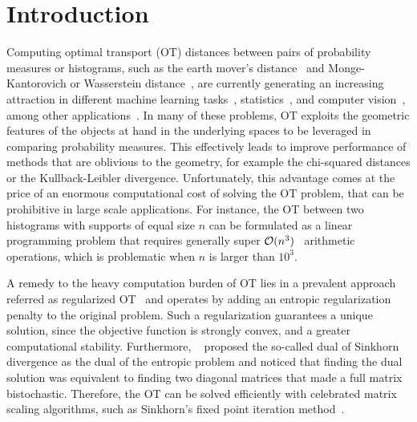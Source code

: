 
\section{Introduction} %
\label{sec:introduction}

Computing optimal transport (OT) distances between pairs of probability measures or histograms, such as the earth mover's distance~\citep{werman1985,Rubner2000} and Monge-Kantorovich or Wasserstein distance~\citep{villani09optimal}, are currently generating an increasing attraction in different machine learning tasks~\citep{pmlr-v32-solomon14,kusnerb2015,pmlr-v70-arjovsky17a,ho2017}, statistics~\citep{frogner2015nips,panaretos2016,ebert2017ConstructionON,bigot2017,flamary2018WDA}, and computer vision~\citep{bonnel2011,Rubner2000,solomon2015}, among other applications~\citep{klouri17,peyre2019COTnowpublisher}.
In many of these problems, OT exploits the geometric features of the objects at hand in the underlying spaces to be leveraged in comparing probability measures.
This effectively leads to improve performance of methods that are oblivious to the geometry, for example the chi-squared distances or the Kullback-Leibler divergence.
Unfortunately, this advantage comes at the price of an enormous computational cost of solving the OT problem, that can be prohibitive in large scale applications.
For instance, the OT between two histograms with supports of equal size $n$ can be formulated as a linear programming problem that requires generally super $\mathcal{O}(n^3)$~\citep{pele2009} arithmetic operations, which is problematic when $n$ is larger than $10^3.$

A remedy to the heavy computation burden of OT lies in a prevalent approach referred as regularized OT~\citep{cuturinips13} and operates by adding an entropic regularization penalty to the original problem.  
Such a regularization guarantees a unique solution, since the objective function is strongly convex, and a greater computational stability.
Furthermore, ~\citet{cuturinips13} proposed the so-called {dual of Sinkhorn divergence} as the dual of the entropic problem and noticed that finding the dual solution was equivalent to finding two diagonal matrices that made a full matrix bistochastic.
Therefore, the OT can be solved efficiently with celebrated matrix scaling algorithms, such as Sinkhorn's fixed point iteration method~\citep{sinkhorn1967,knight2008,kalantari2008}. 

